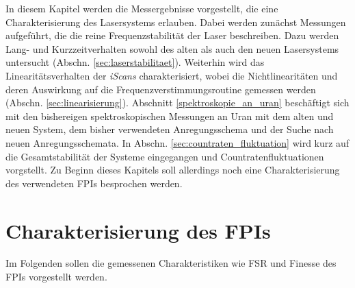 In diesem Kapitel werden die Messergebnisse vorgestellt, die eine
Charakterisierung des Lasersystems erlauben. Dabei werden zunächst Messungen
aufgeführt, die die reine Frequenzstabilität der Laser beschreiben. Dazu werden
Lang- und Kurzzeitverhalten sowohl des alten als auch den neuen Lasersystems
untersucht (Abschn. \ref{sec:laserstabilitaet}). Weiterhin wird das
Linearitätsverhalten der \textit{iScans} charakterisiert, wobei die
Nichtlinearitäten und deren Auswirkung auf die
Frequenzverstimmungsroutine gemessen werden (Abschn.
\ref{sec:linearisierung}). Abschnitt \ref{spektroskopie_an_uran} beschäftigt
sich mit den bishereigen spektroskopischen Messungen an Uran mit dem alten und
neuen System, dem bisher verwendeten Anregungsschema und der Suche nach neuen
Anregungsschemata. In Abschn. \ref{sec:countraten_fluktuation} wird kurz auf die
Gesamtstabilität der Systeme eingegangen und Countratenfluktuationen vorgstellt.
Zu Beginn dieses Kapitels soll allerdings noch eine Charakterisierung des
verwendeten FPIs besprochen werden.

\section{Charakterisierung des FPIs}\label{sec:charakterisierung_FPI}
Im Folgenden sollen die gemessenen Charakteristiken wie FSR und Finesse des FPIs
vorgestellt werden.

